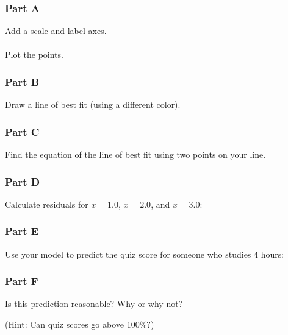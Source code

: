 \documentclass[12pt]{article}
\begin{document}
\begin{itemize}
			\subsubsection*{Part A}
			
				Add a scale and label axes.\\\\
				Plot the points.

				\vspace{8cm}

			\subsubsection*{Part B}

				Draw a line of best fit (using a different color).

				\newpage

			\subsubsection*{Part C}

				Find the equation of the line of best fit using two points on your line.

				\vspace{5cm}

			\subsubsection*{Part D}
				
				Calculate residuals for $x = 1.0$, $x = 2.0$, and $x = 3.0$:

				\vspace{5cm}

			\subsubsection*{Part E}
				
				Use your model to predict the quiz score for someone who studies 4 hours:

				\vspace{2cm}

			\subsubsection*{Part F}
			
				Is this prediction reasonable? Why or why not?

				(Hint: Can quiz scores go above 100\%?)


\end{itemize}
\end{document}
